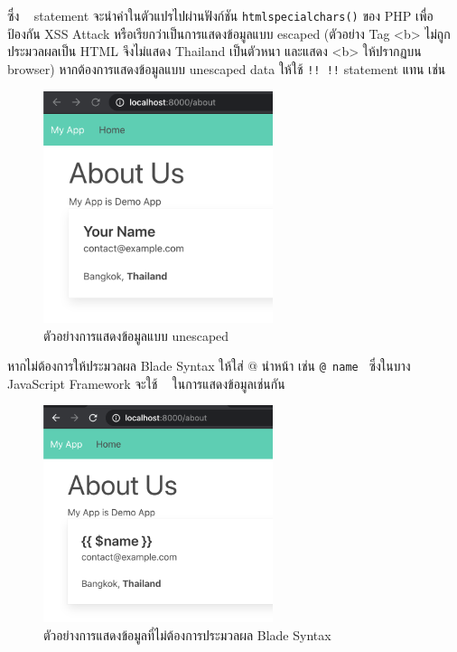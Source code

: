 ซึ่ง \texttt{{{ }}} statement จะนำค่าในตัวแปรไปผ่านฟังก์ชัน \texttt{htmlspecialchars()} ของ PHP เพื่อป้องกัน XSS Attack 
หรือเรียกว่าเป็นการแสดงข้อมูลแบบ escaped (ตัวอย่าง Tag <b> ไม่ถูกประมวลผลเป็น HTML จึงไม่แสดง Thailand เป็นตัวหนา และแสดง <b> ให้ปรากฏบน browser)
\newpage
หากต้องการแสดงข้อมูลแบบ unescaped data ให้ใช้ \texttt{{!! !!}} statement แทน เช่น 


\begin{figure}[h!]
    \centering
    \includegraphics[width=0.6\textwidth]{images/ch4/03.png}
    \caption{ตัวอย่างการแสดงข้อมูลแบบ unescaped}
\end{figure}
\newpage
หากไม่ต้องการให้ประมวลผล Blade Syntax ให้ใส่ @ นำหน้า เช่น \texttt{@{{ name }}} ซึ่งในบาง JavaScript Framework จะใช้ \texttt{{{ }}} ในการแสดงข้อมูลเช่นกัน


\begin{figure}[h!]
    \centering
    \includegraphics[width=0.6\textwidth]{images/ch4/04.png}
    \caption{ตัวอย่างการแสดงข้อมูลที่ไม่ต้องการประมวลผล Blade Syntax}
\end{figure}

